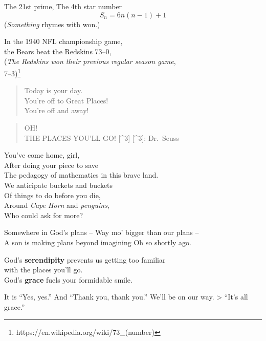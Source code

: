 \documentclass[
]{book}
\begin{document}
The 21st prime, The 4th star number \[S_n=6n(n-1)+1\] (\emph{Something} rhymes with won.)

In the 1940 NFL championship game,\\
the Bears beat the Redskins 73--0,\\
(\emph{The Redskins won their previous regular season game},\\
7--3)\footnote{https://en.wikipedia.org/wiki/73\_(number)}

\begin{quote}
Today is your day.\\
You're off to Great Places!\\
You're off and away!
\end{quote}

\begin{quote}
OH!\\
THE PLACES YOU'LL GO! {[}\^{}3{]} {[}\^{}3{]}: Dr.~Seuss
\end{quote}

You've come home, girl,\\
After doing your piece to save\\
The pedagogy of mathematics in this brave land.\\
We anticipate buckets and buckets\\
Of things to do before you die,\\
Around \emph{Cape Horn} and \emph{penguins},\\
Who could ask for more?

Somewhere in God's plans -- Way mo' bigger than our plans --\\
A son is making plans beyond imagining Oh so shortly ago.

God's \textbf{serendipity} prevents us getting too familiar\\
with the places you'll go.\\
God's \textbf{grace} fuels your formidable smile.

It is ``Yes, yes.'' And ``Thank you, thank you.'' We'll be on our way. \textgreater{} ``It's all grace.''

\backmatter
\end{document}
